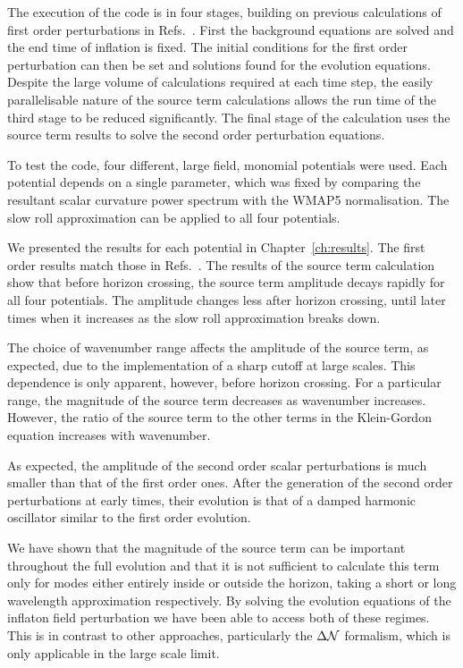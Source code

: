 The execution of the code is in four stages, building on previous calculations of
first order perturbations in Refs.~\cite{Martin:2006rs, Ringeval:2007am,
Salopek:1988qh}. First the background equations are solved and the end time of
inflation is fixed. The initial conditions for the first order perturbation can then
be set and solutions found for the evolution equations.
Despite the large volume of calculations required at each
time step, the easily parallelisable nature of the source term calculations allows
the run time of the third stage to be reduced significantly. 
The final stage of the calculation uses the source term results to solve the second
order perturbation equations.


To test the code, four different, large field, monomial potentials were used. Each
potential depends on a single parameter, which was fixed by comparing the resultant scalar
curvature power spectrum with the WMAP5 normalisation. The slow roll
approximation can be applied to all four potentials.

We presented the results for each potential in Chapter~\ref{ch:results}. The first
order results match those in Refs.~\cite{Martin:2006rs, Ringeval:2007am, Salopek:1988qh}. The
results of the source term calculation show that before
horizon crossing, the source term amplitude decays rapidly for all four potentials.
The amplitude changes less after horizon crossing, until later times when it increases
as the slow roll approximation breaks down.

The choice of wavenumber range affects the amplitude of the source term, as
expected, due to the implementation of a sharp cutoff at large scales. This
dependence is only apparent, however, before horizon crossing. For a particular
range,  the magnitude of the source term decreases as wavenumber increases. However,
the ratio of the source term to the other terms in the Klein-Gordon equation increases with
wavenumber. 

As expected, the amplitude of the second order scalar perturbations is much smaller
than that of the first order ones. After the generation of the second order
perturbations at early times, their evolution is that of a damped harmonic
oscillator similar to the first order evolution.

We have shown that the magnitude of the source term can be important throughout the
full evolution and that it is not sufficient to calculate this term only for
modes either entirely inside or outside the horizon, \iec taking a short or long
wavelength approximation respectively. By solving the evolution equations of the
inflaton field perturbation we have been able to access both of these
regimes. This is in contrast to other approaches, particularly the $\Delta\mathcal{N}$
formalism, which is only applicable in the large scale limit.


